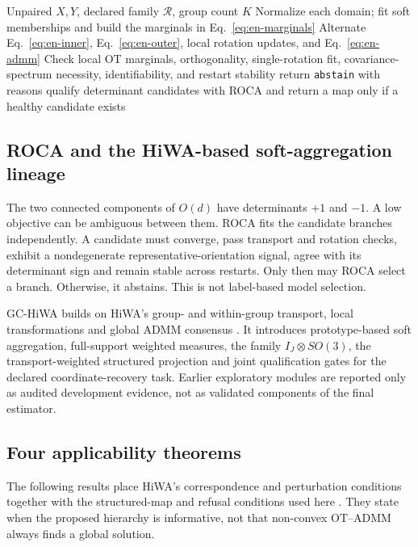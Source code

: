 \documentclass[10pt,a4paper]{article}
\begin{document}
\begin{algorithm}[t]\caption{GC-HiWA with qualification}\begin{algorithmic}[1]
\Require Unpaired $X,Y$, declared family $\mathcal R$, group count $K$
\State Normalize each domain; fit soft memberships and build the marginals in Eq.~\ref{eq:en-marginals}
\State Alternate Eq.~\ref{eq:en-inner}, Eq.~\ref{eq:en-outer}, local rotation updates, and Eq.~\ref{eq:en-admm}
\State Check local OT marginals, orthogonality, single-rotation fit, covariance-spectrum necessity, identifiability, and restart stability
 \State return \texttt{abstain} with reasons \Else \State qualify determinant candidates with ROCA and return a map only if a healthy candidate exists \EndIf
\end{algorithmic}\end{algorithm}

\begin{samepage}
\subsection{ROCA and the HiWA-based soft-aggregation lineage}
The two connected components of $O(d)$ have determinants $+1$ and $-1$. A low objective can be ambiguous between them. ROCA fits the candidate branches independently. A candidate must converge, pass transport and rotation checks, exhibit a nondegenerate representative-orientation signal, agree with its determinant sign and remain stable across restarts. Only then may ROCA select a branch. Otherwise, it abstains. This is not label-based model selection.

GC-HiWA builds on HiWA's group- and within-group transport, local transformations and global ADMM consensus \cite{lee2019hierarchical}. It introduces prototype-based soft aggregation, full-support weighted measures, the family $I_J\otimes SO(3)$, the transport-weighted structured projection and joint qualification gates for the declared coordinate-recovery task. Earlier exploratory modules are reported only as audited development evidence, not as validated components of the final estimator.
\end{samepage}

\subsection{Four applicability theorems}
The following results place HiWA's correspondence and perturbation conditions together with the structured-map and refusal conditions used here \cite{lee2019hierarchical}. They state when the proposed hierarchy is informative, not that non-convex OT--ADMM always finds a global solution.
\end{document}

